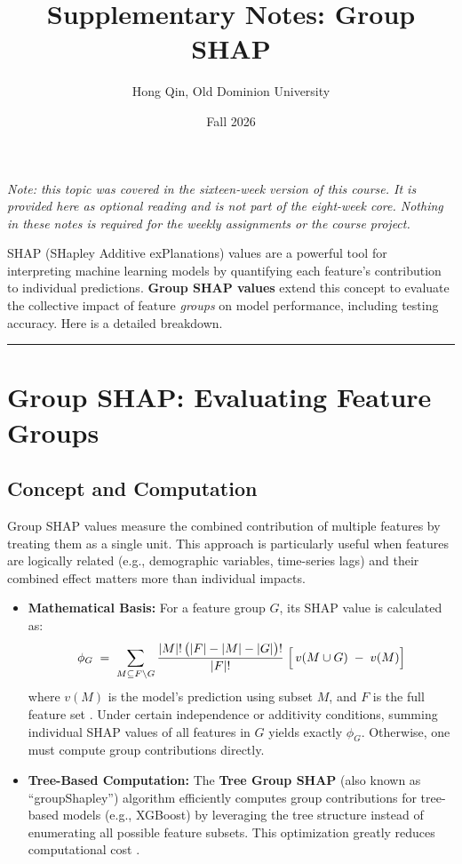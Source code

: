 \documentclass[11pt]{article}
\title{Supplementary Notes: Group SHAP}
\author{Hong Qin, Old Dominion University}
\date{Fall 2026}
\theoremstyle{remark}
\begin{document}
\maketitle
\begin{center}\small\itshape Note: this topic was covered in the sixteen-week version of this course. It is provided here as optional reading and is not part of the eight-week core. Nothing in these notes is required for the weekly assignments or the course project.\end{center}
\medskip

\noindent
SHAP (SHapley Additive exPlanations) values are a powerful tool for interpreting machine learning models by quantifying each feature's contribution to individual predictions. \textbf{Group SHAP values} extend this concept to evaluate the collective impact of feature \emph{groups} on model performance, including testing accuracy. Here is a detailed breakdown.

\bigskip
\hrule
\bigskip

\section{Group SHAP: Evaluating Feature Groups}

\subsection{Concept and Computation}
Group SHAP values measure the combined contribution of multiple features by treating them as a single unit. This approach is particularly useful when features are logically related (e.g., demographic variables, time-series lags) and their combined effect matters more than individual impacts.

\begin{itemize}
  \item \textbf{Mathematical Basis:}
    For a feature group \(G\), its SHAP value is calculated as:
    \[
      \phi_{G} \;=\;
      \sum_{M \subseteq F \setminus G}
      \frac{|M|!\,\bigl(|F| - |M| - |G|\bigr)!}{|F|!} \;\Bigl[\,v(M \cup G)\;-\;v(M)\Bigr]
    \]
    where \(v(M)\) is the model's prediction using subset \(M\), and \(F\) is the full feature set \cite{jullum2021groupShapley}. Under certain independence or additivity conditions, summing individual SHAP values of all features in \(G\) yields exactly \(\phi_{G}\). Otherwise, one must compute group contributions directly.

  \item \textbf{Tree-Based Computation:}
    The \textbf{Tree Group SHAP} (also known as ``groupShapley'') algorithm efficiently computes group contributions for tree-based models (e.g., XGBoost) by leveraging the tree structure instead of enumerating all possible feature subsets. This optimization greatly reduces computational cost \cite{jullum2021groupShapley}.
\end{itemize}
\end{document}
